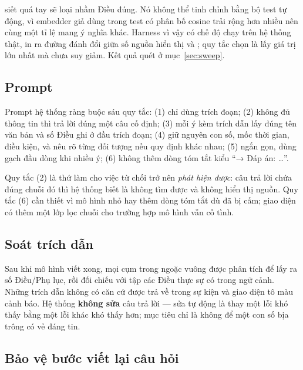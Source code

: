 \begin{notebox}[title={Tham số phải đo, không đoán}]
 siết quá tay sẽ loại nhầm Điều đúng. Nó không thể tinh chỉnh bằng bộ
test tự động, vì embedder giả dùng trong test có phân bố cosine trải rộng hơn 
nhiều nên cùng một tỉ lệ mang ý nghĩa khác. Harness vì vậy có chế độ  chạy trên
hệ thống thật, in ra đường đánh đổi giữa số nguồn hiển thị và ; quy tắc chọn là lấy
giá trị lớn nhất mà  chưa suy giảm. Kết quả quét ở mục~\ref{sec:sweep}.
\end{notebox}

\subsection{Prompt}
\label{sec:prompt}

Prompt hệ thống ràng buộc sáu quy tắc: (1) chỉ dùng trích đoạn; (2) không đủ thông tin thì trả
lời đúng một câu cố định; (3) mỗi ý kèm trích dẫn lấy đúng tên văn bản và số Điều ghi ở đầu
trích đoạn; (4) giữ nguyên con số, mốc thời gian, điều kiện, và nêu rõ từng đối tượng nếu quy
định khác nhau; (5) ngắn gọn, dùng gạch đầu dòng khi nhiều ý; (6) không thêm dòng tóm tắt kiểu
“→ Đáp án: …”.

Quy tắc (2) là thứ làm cho việc từ chối trở nên \emph{phát hiện được}: câu trả lời chứa đúng
chuỗi đó thì hệ thống biết là không tìm được và không hiển thị nguồn. Quy tắc (6) cần thiết vì
mô hình nhỏ hay thêm dòng tóm tắt dù đã bị cấm; giao diện có thêm một lớp lọc chuỗi cho trường
hợp mô hình vẫn cố tình.

\subsection{Soát trích dẫn}

Sau khi mô hình viết xong, mọi cụm trong ngoặc vuông được phân tích để lấy ra số Điều/Phụ lục,
rồi đối chiếu với tập các Điều thực sự có trong ngữ cảnh. Những trích dẫn không có căn cứ được
trả về trong sự kiện  và giao diện tô màu cảnh báo. Hệ thống \textbf{không sửa} câu
trả lời — sửa tự động là thay một lỗi khó thấy bằng một lỗi khác khó thấy hơn; mục tiêu chỉ là
không để một con số bịa trông có vẻ đáng tin.

\subsection{Bảo vệ bước viết lại câu hỏi}
\label{sec:rewrite}

